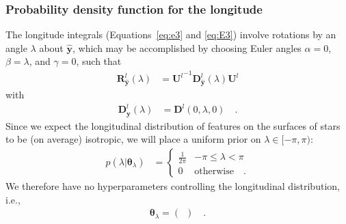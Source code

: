 \documentclass[modern]{aastex62}
\begin{document}
\subsubsection{Probability density function for the longitude}
%
The longitude integrals (Equations~\ref{eq:e3} and \ref{eq:E3}) involve
rotations by an angle $\lambda$ about $\hat{\mathbf{y}}$, which
may be accomplished by choosing
Euler angles $\alpha = 0$, $\beta = \lambda$, and
$\gamma = 0$, such that
%
\begin{align}
    \mathbf{R}^l_{\hat{\mathbf{y}}}(\lambda)
     & =
    {\mathbf{U}^l}^{-1} \mathbf{D}^l_{\hat{\mathbf{y}}}(\lambda) \mathbf{U}^l
\end{align}
%
with
\begin{align}
    \mathbf{D}^l_{\hat{\mathbf{y}}}(\lambda)
     & =
    \mathbf{D}^l\left(0, \lambda, 0\right)
    \quad.
\end{align}
%
Since we expect the longitudinal distribution of features on the surfaces
of stars to be (on average) isotropic, we will place a uniform prior on
$\lambda \in [-\pi, \pi)$:
%
\begin{align}
    p(\lambda \big| \pmb{\theta}_\lambda)
     & =
    \begin{cases}
        \frac{1}{2\pi} & -\pi \leq \lambda < \pi
        \\
        0              & \mathrm{otherwise} \quad.
    \end{cases}
\end{align}
%
We therefore have no hyperparameters
controlling the longitudinal distribution, i.e.,
%
\begin{align}
    \pmb{\theta}_\lambda = \left( \,\,\, \right)
    \quad.
\end{align}
%
\end{document}
